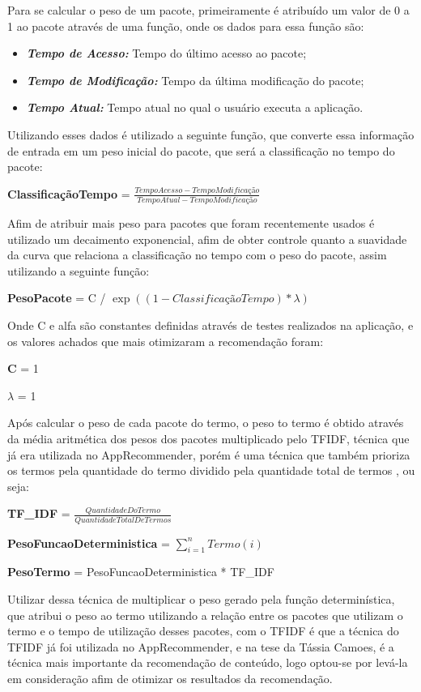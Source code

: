 Para se calcular o peso de um pacote, primeiramente é atribuído um valor de
0 a 1 ao pacote através de uma função, onde os dados para essa função são:

\begin{itemize}
  \item \textit{\textbf{Tempo de Acesso:}} Tempo do último acesso ao pacote;
  \item \textit{\textbf{Tempo de Modificação:}} Tempo da última modificação do pacote;
  \item \textit{\textbf{Tempo Atual:}} Tempo atual no qual o usuário executa a aplicação.
\end{itemize}

Utilizando esses dados é utilizado a seguinte função, que converte essa
informação de entrada em um peso inicial do pacote, que será a classificação
no tempo do pacote:

\textbf{ClassificaçãoTempo} = $\frac{TempoAcesso - TempoModificação}{TempoAtual -
TempoModificação}$

Afim de atribuir mais peso para pacotes que foram recentemente usados é
utilizado um decaimento exponencial, afim de obter controle quanto a
suavidade da curva que relaciona a classificação no tempo com o peso do pacote,
assim utilizando a seguinte função:

\textbf{PesoPacote} = C / $\exp\left(({1 - ClassificaçãoTempo}) * {\lambda}\right)$

Onde C e alfa são constantes definidas através de testes realizados na
aplicação, e os valores achados que mais otimizaram a recomendação foram:

\textbf{C} = 1

\textbf{$\lambda$} = 1

Após calcular o peso de cada pacote do termo, o peso to termo é obtido
através da média aritmética dos pesos dos pacotes multiplicado pelo TFIDF,
técnica que já era utilizada no AppRecommender, porém é uma técnica que
também prioriza os termos pela quantidade do termo dividido pela quantidade
total de termos \cite{araujo2011apprecommender}, ou seja:

\textbf{TF\_IDF} = $\frac{QuantidadeDoTermo} {QuantidadeTotalDeTermos}$

\textbf{PesoFuncaoDeterministica} = $\sum_{i=1}^{n} Termo(i)$

\textbf{PesoTermo} = PesoFuncaoDeterministica * TF\_IDF

Utilizar dessa técnica de multiplicar o peso gerado pela função
determinística, que atribui o peso ao termo utilizando a relação entre os
pacotes que utilizam o termo e o tempo de utilização desses pacotes, com
o TFIDF é que a técnica do TFIDF já foi utilizada no AppRecommender, e na
tese da Tássia Camoes, é a técnica mais importante da recomendação de
conteúdo, logo optou-se por levá-la em consideração afim de otimizar os
resultados da recomendação.

